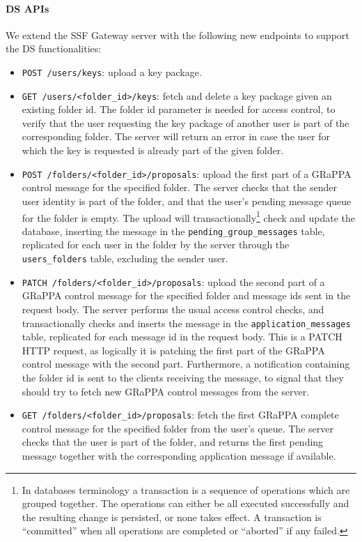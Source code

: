 \paragraph{DS APIs}
We extend the SSF Gateway server with the following new endpoints to support the DS functionalities:
\begin{itemize}
    \item \texttt{POST /users/keys}: upload a key package.
    \item \texttt{GET /users/<folder\_id>/keys}: fetch and delete a key package given an existing folder id. The folder id parameter is needed for access control, to verify that the user requesting the key package of another user is part of the corresponding folder. The server will return an error in case the user for which the key is requested is already part of the given folder.
    \item \texttt{POST /folders/<folder\_id>/proposals}: upload the first part of a GRaPPA control message for the specified folder. The server checks that the sender user identity is part of the folder, and that the user's pending message queue for the folder is empty. The upload will transactionally\footnote{In databases terminology a transaction is a sequence of operations which are grouped together. The operations can either be all executed successfully and the resulting change is persisted, or none takes effect. A transaction is ``committed'' when all operations are completed or ``aborted'' if any failed.} check and update the database, inserting the message in the \texttt{pending\_group\_messages} table, replicated for each user in the folder by the server through the \texttt{users\_folders} table, excluding the sender user.
    \item \texttt{PATCH /folders/<folder\_id>/proposals}: upload the second part of a GRaPPA control message for the specified folder and message ids sent in the request body. The server performs the usual access control checks, and transactionally checks and inserts the message in the \texttt{application\_messages} table, replicated for each message id in the request body. This is a PATCH HTTP request, as logically it is patching the first part of the GRaPPA control message with the second part. Furthermore, a notification containing the folder id is sent to the clients receiving the message, to signal that they should try to fetch new GRaPPA control messages from the server. 
    \item \texttt{GET /folders/<folder\_id>/proposals}: fetch the first GRaPPA complete control message for the specified folder from the user's queue. The server checks that the user is part of the folder, and returns the first pending message together with the corresponding application message if available.

\end{itemize}
